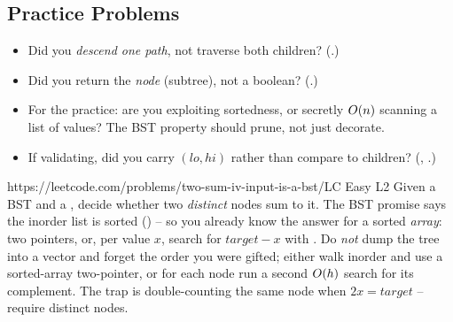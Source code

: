 \subsection{Practice Problems}

\begin{stuckbox}
\begin{itemize}[nosep, leftmargin=1.4em]
  \item Did you \emph{descend one path}, not traverse both children? (.)
  \item Did you return the \emph{node} (subtree), not a boolean? (.)
  \item For the practice: are you exploiting sortedness, or secretly $O(n)$ scanning a list of
        values? The BST property should prune, not just decorate.
  \item If validating, did you carry $(\mathit{lo},\mathit{hi})$ rather than compare to children?
        (, .)
\end{itemize}
\end{stuckbox}

\begin{practiceset}
    {https://leetcode.com/problems/two-sum-iv-input-is-a-bst/}{LC Easy L2}
    {Given a BST and a , decide whether two \emph{distinct} nodes sum to it. The BST
    promise says the inorder list is sorted () -- so you already know the
    answer for a sorted \emph{array}: two pointers, or, per value $x$, search for $\mathit{target}-x$
    with . Do \emph{not} dump the tree into a vector and forget the order you
    were gifted; either walk inorder and use a sorted-array two-pointer, or for each node run a
    second $O(h)$ search for its complement. The trap is double-counting the same node when
    $2x=\mathit{target}$ -- require distinct nodes.}
\end{practiceset}

